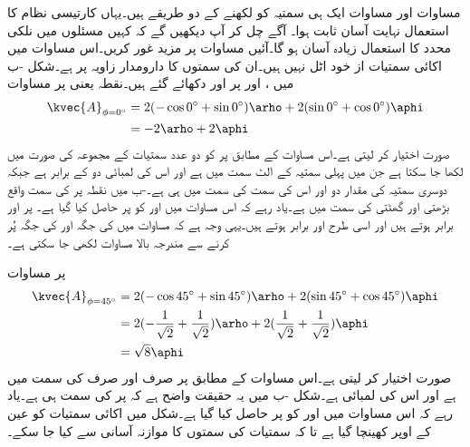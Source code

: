 مساوات  اور مساوات  ایک ہی سمتیہ کو لکھنے کے دو طریقے ہیں۔یہاں کارتیسی نظام کا استعمال نہایت آسان ثابت ہوا۔ آگے چل کر آپ دیکھیں گے کہ کہیں مسئلوں میں نلکی محدد کا استعمال زیادہ آسان ہو گا۔آئیں مساوات  پر مزید غور کریں۔اس مساوات میں اکائی سمتیات از خود اٹل نہیں ہیں۔ان کی سمتوں کا دارومدار زاویہ  پر ہے۔شکل  -ب میں ،  اور  پر  اور  دکھائے گئے ہیں۔نقطہ  یعنی  پر مساوات  
\begin{align*}
\kvec{A}_{ \phi=0^\circ}&=2(- \cos 0^\circ + \sin 0^\circ ) \arho +2( \sin 0^\circ  + \cos 0^\circ )\aphi\\
&=-2\arho+2\aphi 
\end{align*} 
صورت اختیار کر لیتی ہے۔اس مساوات کے مطابق  پر  کو دو عدد سمتیات کے مجموعہ کی صورت میں لکھا جا سکتا ہے جن میں پہلی سمتیہ  کے الٹ سمت میں ہے اور اس کی لمبائی دو کے برابر ہے جبکہ دوسری سمتیہ کی مقدار دو اور اس کی سمت  کی سمت میں ہی ہے۔-ب میں نقطہ  پر  کی سمت واقع بڑھتی  اور گھٹتی  کی سمت میں ہے۔یاد رہے کہ اس مساوات میں  اور  کو  پر حاصل کیا گیا ہے۔ پر  اور  برابر ہوتے ہیں اور اسی طرح  اور  برابر ہوتے ہیں۔یہی وجہ ہے کہ مساوات  میں  کی جگہ  اور  کی جگہ  پُر کرنے سے مندرجہ بالا مساوات لکھی جا سکتی ہے۔

 پر مساوات 
\begin{align*}
\kvec{A}_{\phi=45^\circ}&=2(- \cos 45^\circ + \sin 45^\circ ) \arho +2( \sin 45^\circ  + \cos 45^\circ )\aphi\\
&=2(- \frac{1}{\sqrt{2}} +\frac{1}{\sqrt{2}} ) \arho +2( \frac{1}{\sqrt{2}}  + \frac{1}{\sqrt{2}} )\aphi\\
&=\sqrt{8} \aphi
\end{align*} 
صورت اختیار کر لیتی ہے۔اس مساوات کے مطابق  پر  صرف اور صرف  کی سمت میں ہے اور اس کی لمبائی  ہے۔شکل -ب میں یہ حقیقت واضح ہے کہ   پر  کی سمت  ہی ہے۔یاد رہے کہ اس مساوات میں  اور  کو  پر حاصل کیا گیا ہے۔شکل میں اکائی سمتیات کو عین  کے اوپر کھینچا گیا ہے تا کہ سمتیات کی سمتوں کا موازنہ آسانی سے کیا جا سکے۔


